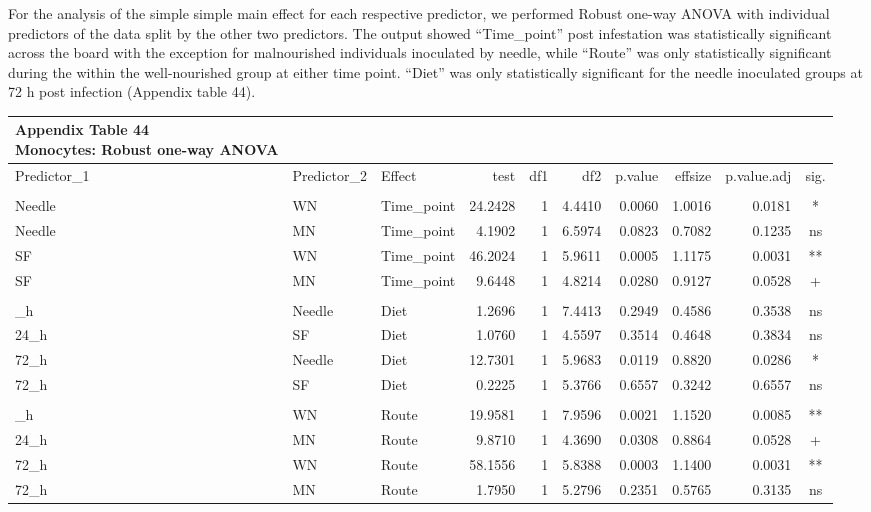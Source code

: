 \documentclass[
  12pt,
  letterpaper,
]{article}
\begin{document}
For the analysis of the simple simple main effect for each respective predictor, we performed Robust one-way ANOVA with individual predictors of the data split by the other two predictors. The output showed ``Time\_point'' post infestation was statistically significant across the board with the exception for malnourished individuals inoculated by needle, while ``Route'' was only statistically significant during the within the well-nourished group at either time point. ``Diet'' was only statistically significant for the needle inoculated groups at 72 h post infection (Appendix table 44).

\begingroup
\fontsize{12.0pt}{14.4pt}\selectfont
\begin{longtable}{lllrrrrrrc}
\caption*{
{\large \textbf{Appendix Table 44}} \\ 
{\small \textbf{Monocytes: Robust one-way ANOVA}}
} \\ 
\toprule
Predictor\_1 & Predictor\_2 & {Effect} & {test} & {df1} & {df2} & {p.value} & {effsize} & {p.value.adj} & {sig.} \\ 
\midrule\addlinespace[2.5pt]
\multicolumn{10}{l}{Predictor: Time\_point} \\[2.5pt] 
\midrule\addlinespace[2.5pt]
Needle & WN & Time\_point & 24.2428 & 1 & 4.4410 & 0.0060 & 1.0016 & 0.0181 & * \\ 
Needle & MN & Time\_point & 4.1902 & 1 & 6.5974 & 0.0823 & 0.7082 & 0.1235 & ns \\ 
SF & WN & Time\_point & 46.2024 & 1 & 5.9611 & 0.0005 & 1.1175 & 0.0031 & ** \\ 
SF & MN & Time\_point & 9.6448 & 1 & 4.8214 & 0.0280 & 0.9127 & 0.0528 & + \\ 
\midrule\addlinespace[2.5pt]
\multicolumn{10}{l}{Predictor: Diet} \\[2.5pt] 
\midrule\addlinespace[2.5pt]
24\_h & Needle & Diet & 1.2696 & 1 & 7.4413 & 0.2949 & 0.4586 & 0.3538 & ns \\ 
24\_h & SF & Diet & 1.0760 & 1 & 4.5597 & 0.3514 & 0.4648 & 0.3834 & ns \\ 
72\_h & Needle & Diet & 12.7301 & 1 & 5.9683 & 0.0119 & 0.8820 & 0.0286 & * \\ 
72\_h & SF & Diet & 0.2225 & 1 & 5.3766 & 0.6557 & 0.3242 & 0.6557 & ns \\ 
\midrule\addlinespace[2.5pt]
\multicolumn{10}{l}{Predictor: Route} \\[2.5pt] 
\midrule\addlinespace[2.5pt]
24\_h & WN & Route & 19.9581 & 1 & 7.9596 & 0.0021 & 1.1520 & 0.0085 & ** \\ 
24\_h & MN & Route & 9.8710 & 1 & 4.3690 & 0.0308 & 0.8864 & 0.0528 & + \\ 
72\_h & WN & Route & 58.1556 & 1 & 5.8388 & 0.0003 & 1.1400 & 0.0031 & ** \\ 
72\_h & MN & Route & 1.7950 & 1 & 5.2796 & 0.2351 & 0.5765 & 0.3135 & ns \\ 
\bottomrule
\end{longtable}
\endgroup
\end{document}
